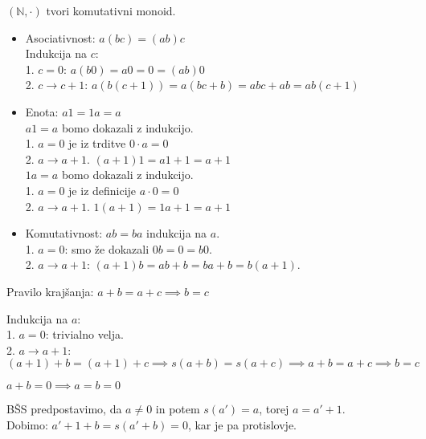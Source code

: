 \begin{trditev}
    $(\mathbb{N}, \cdot)$ tvori komutativni monoid.
\end{trditev}
\begin{dokaz}
    \begin{itemize}

    \item Asociativnost: $a(bc) = (ab)c$ \\
    Indukcija na $c$: \\
    1. $c = 0$: $a(b0) = a0 = 0 = (ab)0$ \\
    2. $c \to c + 1$: $a(b(c + 1)) = a(bc + b) = abc + ab = ab(c + 1)$ \\

    \item Enota: $a1 = 1a = a$ \\
    $a1 = a$ bomo dokazali z indukcijo. \\
    1. $a = 0$ je iz trditve $0\cdot a = 0$ \\
    2. $a \to a + 1$. $(a + 1)1 = a1 + 1 = a + 1$ \\
    $1a = a$ bomo dokazali z indukcijo. \\
    1. $a = 0$ je iz definicije $a\cdot 0 = 0$ \\
    2. $a \to a + 1$. $1(a + 1) = 1a + 1 = a + 1$ \\

    \item Komutativnost: $ab = ba$ indukcija na $a$. \\
    1. $a = 0$: smo že dokazali $0b = 0 = b0$. \\
    2. $a \to a + 1$: $(a + 1)b = ab + b = ba + b = b(a + 1)$.
    \end{itemize}
\end{dokaz}

\begin{trditev}
    Pravilo krajšanja: $a + b = a + c \implies b = c$
\end{trditev}
\begin{dokaz}
    Indukcija na $a$: \\
    1. $a = 0$: trivialno velja. \\
    2. $a \to a + 1$: $(a + 1) + b = (a + 1) + c \implies s(a + b) = s(a + c) \implies a + b = a + c \implies b = c$
\end{dokaz}

\begin{trditev}
    $a + b = 0 \implies a = b = 0$
\end{trditev}
\begin{dokaz}
    BŠS predpostavimo, da $a \neq 0$ in potem $s(a') = a$, torej $a = a' + 1$. \\
    Dobimo: $a' + 1 + b = s(a' + b) = 0$, kar je pa protislovje.
\end{dokaz}

